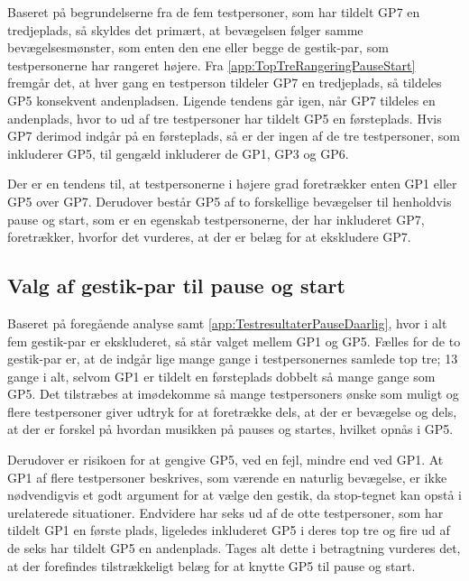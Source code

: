 \noindent
%
Baseret på begrundelserne fra de fem testpersoner, som har tildelt GP7 en tredjeplads, så skyldes det primært, at bevægelsen følger samme bevægelsesmønster, som enten den ene eller begge de gestik-par, som testpersonerne har rangeret højere. Fra \autoref{app:TopTreRangeringPauseStart} fremgår det, at hver gang en testperson tildeler GP7 en tredjeplads, så tildeles GP5 konsekvent andenpladsen. Ligende tendens går igen, når GP7 tildeles en andenplads, hvor to ud af tre testpersoner har tildelt GP5 en førsteplads. Hvis GP7 derimod indgår på en førsteplads, så er der ingen af de tre testpersoner, som inkluderer GP5, til gengæld inkluderer de GP1, GP3 og GP6.

Der er en tendens til, at testpersonerne i højere grad foretrækker enten GP1 eller GP5 over GP7. Derudover består GP5 af to forskellige bevægelser til henholdvis pause og start, som er en egenskab testpersonerne, der har inkluderet GP7, foretrækker, hvorfor det vurderes, at der er belæg for at ekskludere GP7. 
%
\subsection{Valg af gestik-par til pause og start}
\label{TestresultaterValgAfGestikkerValgPauseStart}
%
Baseret på foregående analyse samt \autoref{app:TestresultaterPauseDaarlig}, hvor i alt fem gestik-par er ekskluderet, så står valget mellem GP1 og GP5. Fælles for de to gestik-par er, at de indgår lige mange gange i testpersonernes samlede top tre; 13 gange i alt, selvom GP1 er tildelt en førsteplads dobbelt så mange gange som GP5. Det tilstræbes at imødekomme så mange testpersoners ønske som muligt og flere testpersoner giver udtryk for at foretrække dels, at der er bevægelse og dels, at der er forskel på hvordan musikken på pauses og startes, hvilket opnås i GP5.

Derudover er risikoen for at gengive GP5, ved en fejl, mindre end ved GP1. At GP1 af flere testpersoner beskrives, som værende en naturlig bevægelse, er ikke nødvendigvis et godt argument for at vælge den gestik, da stop-tegnet kan opstå i urelaterede situationer. Endvidere har seks ud af de otte testpersoner, som har tildelt GP1 en første plads, ligeledes inkluderet GP5 i deres top tre og fire ud af de seks har tildelt GP5 en andenplads. Tages alt dette i betragtning vurderes det, at der forefindes tilstrækkeligt belæg for at knytte GP5 til pause og start.

